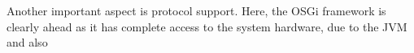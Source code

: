 Another important aspect is protocol support. Here, the OSGi framework is clearly ahead as it has complete access to the system hardware, due to the JVM and also 




